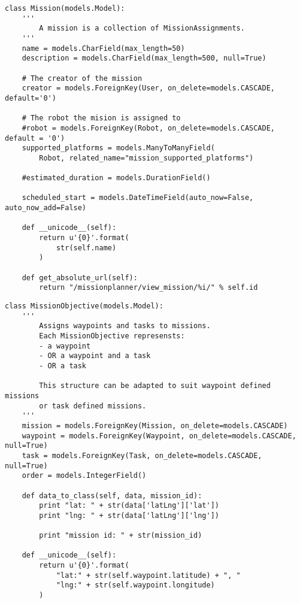 \begin{lstlisting}[style=custompython]
class Mission(models.Model):
    '''
        A mission is a collection of MissionAssignments.
    '''
    name = models.CharField(max_length=50)
    description = models.CharField(max_length=500, null=True)

    # The creator of the mission
    creator = models.ForeignKey(User, on_delete=models.CASCADE, default='0')

    # The robot the mision is assigned to
    #robot = models.ForeignKey(Robot, on_delete=models.CASCADE, default = '0')
    supported_platforms = models.ManyToManyField(
        Robot, related_name="mission_supported_platforms")

    #estimated_duration = models.DurationField()

    scheduled_start = models.DateTimeField(auto_now=False, auto_now_add=False)

    def __unicode__(self):
        return u'{0}'.format(
            str(self.name)
        )

    def get_absolute_url(self):
        return "/missionplanner/view_mission/%i/" % self.id
\end{lstlisting}



\begin{lstlisting}[style=custompython]
class MissionObjective(models.Model):
    '''
        Assigns waypoints and tasks to missions.
        Each MissionObjective represensts:
        - a waypoint
        - OR a waypoint and a task
        - OR a task

        This structure can be adapted to suit waypoint defined missions
        or task defined missions.
    '''
    mission = models.ForeignKey(Mission, on_delete=models.CASCADE)
    waypoint = models.ForeignKey(Waypoint, on_delete=models.CASCADE, null=True)
    task = models.ForeignKey(Task, on_delete=models.CASCADE, null=True)
    order = models.IntegerField()

    def data_to_class(self, data, mission_id):
        print "lat: " + str(data['latLng']['lat'])
        print "lng: " + str(data['latLng']['lng'])

        print "mission id: " + str(mission_id)

    def __unicode__(self):
        return u'{0}'.format(
            "lat:" + str(self.waypoint.latitude) + ", "
            "lng:" + str(self.waypoint.longitude)
        )
\end{lstlisting}





